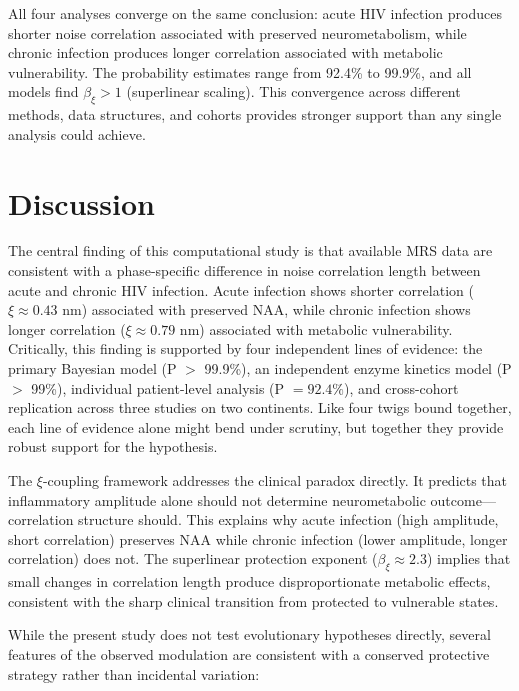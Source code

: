 \documentclass[10pt,a4paper]{article}
\begin{document}
All four analyses converge on the same conclusion: acute HIV infection produces shorter noise correlation associated with preserved neurometabolism, while chronic infection produces longer correlation associated with metabolic vulnerability. The probability estimates range from 92.4\% to 99.9\%, and all models find $\beta_\xi > 1$ (superlinear scaling). This convergence across different methods, data structures, and cohorts provides stronger support than any single analysis could achieve.

\section{Discussion}

The central finding of this computational study is that available MRS data are consistent with a phase-specific difference in noise correlation length between acute and chronic HIV infection. Acute infection shows shorter correlation ($\xi \approx 0.43$ nm) associated with preserved NAA, while chronic infection shows longer correlation ($\xi \approx 0.79$ nm) associated with metabolic vulnerability. Critically, this finding is supported by four independent lines of evidence: the primary Bayesian model (P $>$ 99.9\%), an independent enzyme kinetics model (P $>$ 99\%), individual patient-level analysis (P $= 92.4\%$), and cross-cohort replication across three studies on two continents. Like four twigs bound together, each line of evidence alone might bend under scrutiny, but together they provide robust support for the hypothesis.

The $\xi$-coupling framework addresses the clinical paradox directly. It predicts that inflammatory amplitude alone should not determine neurometabolic outcome---correlation structure should. This explains why acute infection (high amplitude, short correlation) preserves NAA while chronic infection (lower amplitude, longer correlation) does not. The superlinear protection exponent ($\beta_\xi \approx 2.3$) implies that small changes in correlation length produce disproportionate metabolic effects, consistent with the sharp clinical transition from protected to vulnerable states.

While the present study does not test evolutionary hypotheses directly, several features of the observed modulation are consistent with a conserved protective strategy rather than incidental variation:
\end{document}
